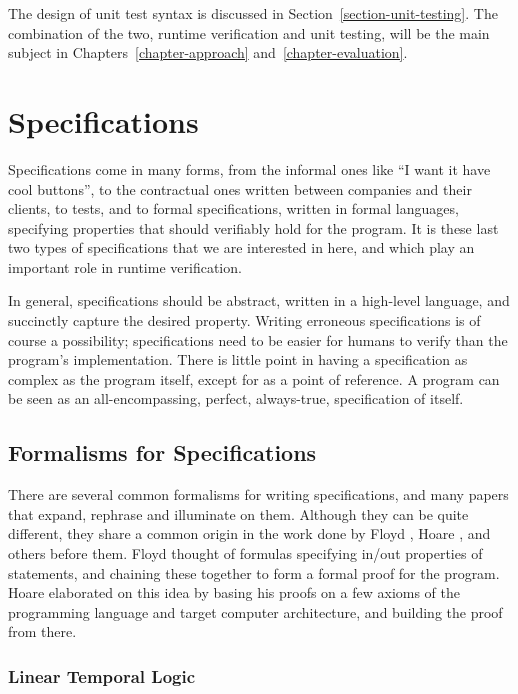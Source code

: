\documentclass[a4paper,11pt]{kth-mag}
\begin{document}
The design of unit test syntax is discussed in
Section~\ref{section-unit-testing}. The combination of the two, runtime
verification and unit testing, will be the main subject in
Chapters~\ref{chapter-approach} and~\ref{chapter-evaluation}.


\section{Specifications} \label{section-specifications}

Specifications come in many forms, from the informal ones like ``I want it have
cool buttons'', to the contractual ones written between companies and their
clients, to tests, and to formal specifications, written in formal languages,
specifying properties that should verifiably hold for the program. It is these
last two types of specifications that we are interested in here, and which play
an important role in runtime verification.

In general, specifications should be abstract, written in a high-level
language, and succinctly capture the desired property. Writing erroneous
specifications is of course a possibility; specifications need to be easier for
humans to verify than the program's implementation. There is little point in
having a specification as complex as the program itself, except for as a point
of reference. A program can be seen as an all-encompassing, perfect,
always-true, specification of itself.


\subsection{Formalisms for Specifications}

There are several common formalisms for writing specifications, and many papers
that expand, rephrase and illuminate on them. Although they can be quite
different, they share a common origin in the work done by Floyd \cite{floyd67},
Hoare \cite{hoare69}, and others before them.  Floyd thought of formulas
specifying in/out properties of statements, and chaining these together to form
a formal proof for the program. Hoare elaborated on this idea by basing his
proofs on a few axioms of the programming language and target computer
architecture, and building the proof from there.


\subsubsection{Linear Temporal Logic}
\end{document}
